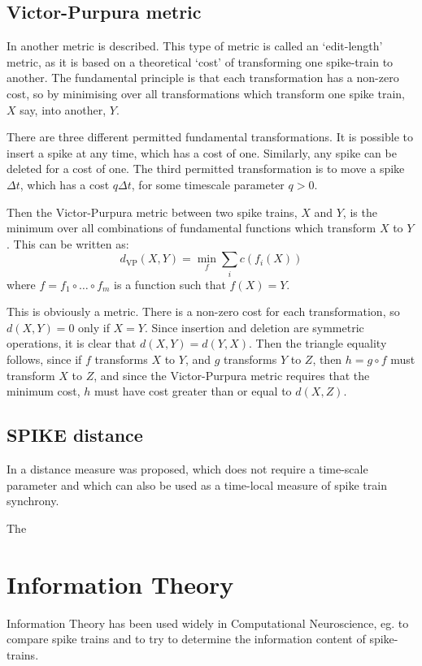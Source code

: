 \subsection{Victor-Purpura metric}

In \cite{VictorPurpura1997a} another metric is described.  This type of metric is called an \lq{}edit-length\rq{} metric, as it is based on a theoretical \lq{}cost\rq{} of transforming one spike-train to another.  The fundamental principle is that each transformation has a non-zero cost, so by minimising over all transformations which transform one spike train, $X$ say, into another, $Y$.

There are three different permitted fundamental transformations.  It is possible to insert a spike at any time, which has a cost of one.  Similarly, any spike can be deleted for a cost of one.  The third permitted transformation is to move a spike $\Delta t$, which has a cost $q\Delta t$, for some timescale parameter $q>0$.

Then the Victor-Purpura metric between two spike trains, $X$ and $Y$, is the minimum over all combinations of fundamental functions which transform $X$ to $Y$.  This can be written as:
\begin{equation}
d_{\text{VP}}(X,Y) = \min_f \sum_i c\left( f_i(X) \right)
\end{equation}
where $f=f_1\circ\ldots\circ f_m$ is a function such that $f(X) = Y$.

This is obviously a metric. There is a non-zero cost for each transformation, so $d(X,Y)=0$ only if $X=Y$. Since insertion and deletion are symmetric operations, it is clear that $d(X,Y)=d(Y,X)$.  Then the triangle equality follows, since if $f$ transforms $X$ to $Y$, and $g$ transforms $Y$ to $Z$, then $h=g\circ f$ must transform $X$ to $Z$, and since the Victor-Purpura metric requires that the minimum cost, $h$ must have cost greater than or equal to $d(X,Z)$.

\subsection{SPIKE distance}
In \cite{KreuzEtAl2011a} a distance measure was proposed, which does not require a time-scale parameter and which can also be used as a time-local measure of spike train synchrony.

The 

\section{Information Theory}
Information Theory has been used widely in Computational Neuroscience, eg. to compare spike trains \cite{BialekEtAl1998a} and to try to determine the information content of spike-trains\cite{GillespieHoughton2009a}.

